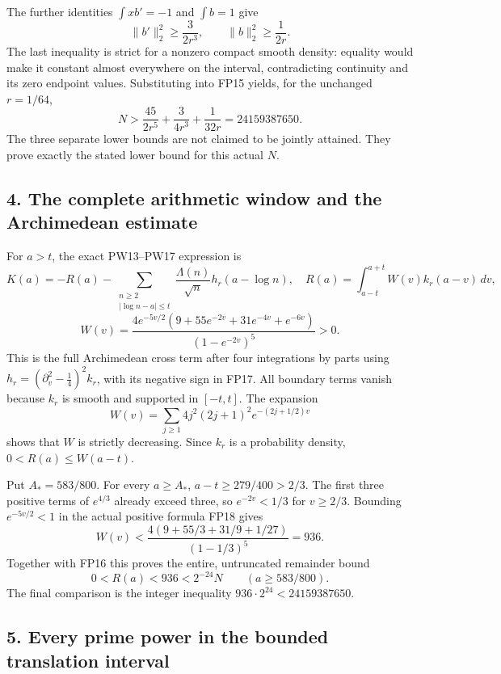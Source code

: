 \documentclass[
  10pt,
  a4paper,
]{article}
\begin{document}
The further identities \(\int xb'=-1\) and \(\int b=1\) give \[
 \|b'\|_2^2\ge\frac3{2r^3},\qquad
 \|b\|_2^2\ge\frac1{2r}.
\] The last inequality is strict for a nonzero compact smooth density:
equality would make it constant almost everywhere on the interval,
contradicting continuity and its zero endpoint values. Substituting into
FP15 yields, for the unchanged \(r=1/64\), \[
 \boxed{\displaystyle
 N>\frac{45}{2r^5}+\frac3{4r^3}+\frac1{32r}
   =24159387650.}
 \tag{FP16}
\] The three separate lower bounds are not claimed to be jointly
attained. They prove exactly the stated lower bound for this actual
\(N\).

\subsection{4. The complete arithmetic window and the Archimedean
estimate}\label{the-complete-arithmetic-window-and-the-archimedean-estimate}

For \(a>t\), the exact PW13--PW17 expression is \[
 K(a)=-R(a)-
       \sum_{\substack{n\ge2\\|\log n-a|\le t}}
         \frac{\Lambda(n)}{\sqrt n}h_r(a-\log n),
 \quad
 R(a)=\int_{a-t}^{a+t}W(v)k_r(a-v)\,dv,
 \tag{FP17}
\] \[
 W(v)=
 \frac{4e^{-5v/2}(9+55e^{-2v}+31e^{-4v}+e^{-6v})}
      {(1-e^{-2v})^5}>0.
 \tag{FP18}
\] This is the full Archimedean cross term after four integrations by
parts using \(h_r=(\partial_v^2-\tfrac14)^2k_r\), with its negative sign
in FP17. All boundary terms vanish because \(k_r\) is smooth and
supported in \([-t,t]\). The expansion \[
 W(v)=\sum_{j\ge1}4j^2(2j+1)^2e^{-(2j+1/2)v}
\] shows that \(W\) is strictly decreasing. Since \(k_r\) is a
probability density, \(0<R(a)\le W(a-t)\).

Put \(A_*=583/800\). For every \(a\ge A_*\), \(a-t\ge279/400>2/3\). The
first three positive terms of \(e^{4/3}\) already exceed three, so
\(e^{-2v}<1/3\) for \(v\ge2/3\). Bounding \(e^{-5v/2}<1\) in the actual
positive formula FP18 gives \[
 W(v)<
 \frac{4(9+55/3+31/9+1/27)}{(1-1/3)^5}=936.
\] Together with FP16 this proves the entire, untruncated remainder
bound \[
 \boxed{\displaystyle 0<R(a)<936<2^{-24}N
                       \qquad(a\ge583/800).}
 \tag{FP19}
\] The final comparison is the integer inequality
\(936\cdot2^{24}<24159387650\).

\subsection{5. Every prime power in the bounded translation
interval}\label{every-prime-power-in-the-bounded-translation-interval}
\end{document}
